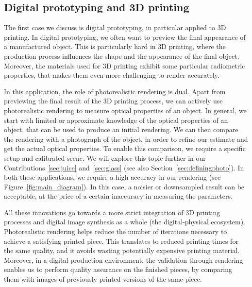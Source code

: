 \subsection{Digital prototyping and 3D printing}
The first case we discuss is digital prototyping, in particular applied to 3D printing. In digital prototyping, we often want to preview the final appearance of a manufactured object. This is particularly hard in 3D printing, where the production process influences the shape and the appearance of the final object. Moreover, the materials used for 3D printing exhibit some particular radiometric properties, that makes them even more challenging to render accurately. 

In this application, the role of photorealistic rendering is dual. Apart from previewing the final result of the 3D printing process, we can actively use photorealistic rendering to measure optical properties of an object. In general, we start with limited or approximate knowledge of the optical properties of an object, that can be used to produce an initial rendering. We can then compare the rendering with a photograph of the object, in order to refine our estimate and get the actual optical properties. To enable this comparison, we require a specific setup and calibrated scene. We will explore this topic further in our Contributions~\ref{sec:juice} and~\ref{sec:glass} (see also Section~\ref{sec:definingphoto}). In both these applications, we require a high accuracy in our rendering (see Figure~\ref{fig:main_diagram}). In this case, a noisier or downsampled result can be acceptable, at the price of a certain inaccuracy in measuring the parameters. 

All these innovations go towards a more strict integration of 3D printing processes and digital image synthesis as a whole (the digital-physical ecosystem). Photorealistic rendering helps reduce the number of iterations necessary to achieve a satisfying printed piece. This translates to reduced printing times for the same quality, and it avoids wasting potentially expensive printing material. Moreover, in a digital production  environment, the validation through rendering enables us to perform quality assurance on the finished pieces, by comparing them with images of previously printed versions of the same piece.
\vfill\clearpage
